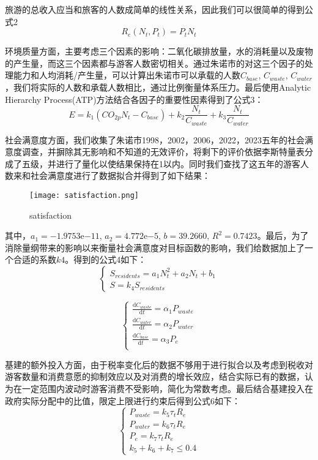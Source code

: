 \documentclass[12pt]{article}  %
\begin{document}
旅游的总收入应当和旅客的人数成简单的线性关系，因此我们可以很简单的得到公式2
\begin{equation}
    R_{e}(N_{t},P_{t}) = P_{t}N_{t}
\end{equation}

环境质量方面，主要考虑三个因素的影响：二氧化碳排放量，水的消耗量以及废物的产生量，而这三个因素都与游客人数密切相关。通过朱诺市的对这三个因子的处理能力和人均消耗/产生量，可以计算出朱诺市可以承载的人数$C_{base}$, $C_{waste}$, $C_{water}$，我们将实际的人数和承载人数相比，通过比例衡量体系压力。最后使用Analytic Hierarchy Process(ATP)方法结合各因子的重要性因素得到了公式3：
\begin{equation}
	E=k_{1}(CO_{2p}N_{t}-C_{base})+k_{2}\frac{N_{t}}{C_{waste}}+k_{3}\frac{N_{t}}{C_{water}}
\end{equation}

社会满意度方面，我们收集了朱诺市1998，2002，2006，2022，2023五年的社会满意度调查\cite{4}，并摒除其无影响和不知道的无效评价，将剩下的评价依据李斯特量表分成了五级，并进行了量化以使结果保持在1以内。同时我们查找了这五年的游客人数\cite{5}来和社会满意度进行了数据拟合并得到了如下结果：
\begin{figure}[H]
	\centering
	\texttt{[image: satisfaction.png]}
	\caption{satisfaction}\label{fig:satisfaction}
\end{figure}
其中，$a_1 = -1.9753 \mathrm{e}{-11}$, $a_2 = 4.772\mathrm{e}{-5}$, $b = 39.2660$, $R^2 = 0.7423$。最后，为了消除量纲带来的影响以来衡量社会满意度对目标函数的影响，我们给数据加上了一个合适的系数$k4$。得到的公式4如下：
\begin{equation}
	\begin{cases}
		S_{residents}=a_{1}N_{t}^2+a_{2}N_{t} + b_{1} \\
		S=k_{4}S_{residents}
	\end{cases}
\end{equation}


	\begin{equation}
	\begin{cases}
		\frac{\mathrm{d}C_{waste}}{\mathrm{d}t}=\alpha_1P_{waste} \\
		\frac{\mathrm{d}C_{water}}{\mathrm{d}t}=\alpha_2P_{water} \\
		\frac{\mathrm{d}C_{base}}{\mathrm{d}t}=\alpha_3P_e \\
	\end{cases}
	\end{equation}

基建的额外投入方面，由于税率变化后的数据不够用于进行拟合以及考虑到税收对游客数量和消费意愿的抑制效应以及对消费的增长效应，结合实际已有的数据，认为在一定范围内波动时游客消费不受影响，简化为常数考虑。最后结合基建投入在政府实际分配中的比值，限定上限进行约束后得到公式6如下：
\begin{equation}
	\begin{cases}
		P_{waste} = k_5\tau_tR_e\\
		P_{water} = k_6\tau_tR_e\\
		P_{e}=k_7\tau_{t}R_e \\
		k_5+k_6+k_7 \leqslant 0.4
	\end{cases}
\end{equation}
\end{document}
